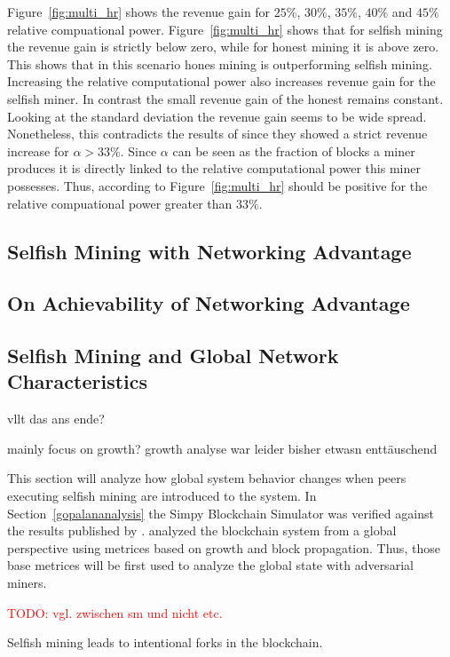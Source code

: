 Figure~\ref{fig:multi_hr} shows the revenue gain for $25\% $, $30\%$, $35\% $, $40\% $ and $45\% $ relative compuational power. Figure~\ref{fig:multi_hr} shows that for selfish mining the revenue gain is strictly below zero, while for honest mining it is above zero. This shows that in this scenario hones mining is outperforming selfish mining. Increasing the relative computational power also increases revenue gain for the selfish miner. In contrast the small revenue gain of the honest remains constant. Looking at the standard deviation the revenue gain seems to be wide spread. Nonetheless, this contradicts the results of  since they showed a strict revenue increase for $\alpha > 33\% $. Since $\alpha$ can be seen as the fraction of blocks a miner produces it is directly linked to the relative computational power this miner possesses. Thus, according to  Figure~\ref{fig:multi_hr} should be positive for the relative compuational power greater than $33\% $.
\subsection{Selfish Mining with Networking Advantage}
\subsection{On Achievability of Networking Advantage}

\subsection{Selfish Mining and Global Network Characteristics}
vllt das ans ende?	

mainly focus on growth? growth analyse war leider bisher etwasn enttäuschend

This section will analyze how global system behavior changes when peers executing selfish mining are introduced to the system. In Section~\ref{gopalananalysis} the Simpy Blockchain Simulator was verified against the results published by \gopalan. \gopalan analyzed the blockchain system from a global perspective using metrices based on growth and block propagation. Thus, those base metrices will be first used to analyze the global state with adversarial miners.

\textcolor{red}{TODO: vgl. zwischen sm und nicht etc.}

Selfish mining leads to intentional forks in the blockchain.

  







